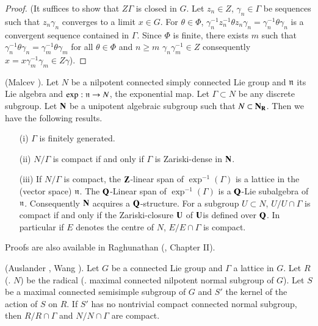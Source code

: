 \begin{proof}
(It suffices to show that $Z\Gamma$ is closed in $G$. Let $z_n \in Z$, $\gamma_n \in \Gamma$ be sequences such that $z_n \gamma_n$ converges to a limit $x \in G$. For $\theta \in \Phi$, $\gamma^{-1}_n z^{-1}_n \theta z_n \gamma_n = \gamma_n^{-1} \theta \gamma_n$ is a convergent sequence contained in $\Gamma$. Since $\Phi$ is finite, there exists $m$ such that $\gamma^{-1}_n \theta \gamma_n = \gamma^{-1}_m \theta \gamma_m$ for all $\theta \in \Phi$ and $n \geqslant m$ \ie $\gamma_n \gamma^{-1}_m \in Z$ consequently $x = x \gamma^{-1}_m \gamma_m \in Z \gamma$).
\end{proof}

\begin{romantheorem}{\rm (Malcev \cite{art9-key1}).}\label{art9-romanthm2}
Let $N$ be a nilpotent connected simply connected Lie group and $\mathfrak{n}$ its Lie algebra and $\exp: \mathfrak{n} \to N$, the exponential map. Let $\Gamma \subset N$ be any discrete subgroup. Let $\mathbf{N}$ be a unipotent algebraic subgroup such that $N \subset \mathbf{N}_{\mathbf{R}}$. Then we have the following results.
\begin{itemize}
\item[(i)] $\Gamma$ is finitely generated.

\item[(ii)] $N/\Gamma$ is compact if and only if $\Gamma$ is Zariski-dense in $\mathbf{N}$.

\item[(iii)] If $N/ \Gamma$ is compact, the $\mathbf{Z}$-linear span of $\exp^{-1} (\Gamma)$ is a lattice in the (vector space) $\mathfrak{n}$. The $\mathbf{Q}$-Linear span of $\exp^{-1} (\Gamma)$ is a $\mathbf{Q}$-Lie subalgebra of $\mathfrak{n}$. Consequently $\mathbf{N}$ acquires a $\mathbf{Q}$-structure. For a subgroup $U \subset N$, $U/U \cap \Gamma$ is compact if and only if the Zariski-closure $\mathbf{U}$ of $\mathbf{U}$\pageoriginale is defined over $\mathbf{Q}$. In particular if $E$ denotes the centre of $N$, $E/E \cap \Gamma$ is compact.
\end{itemize}
\end{romantheorem}

Proofs are also available in Raghunathan (\cite{art9-key1}, Chapter II).

\begin{romantheorem}{\rm (Auslander \cite{art9-key1}, Wang \cite{art9-key1}).}\label{art9-romanthm3}
Let $G$ be a connected Lie group and $\Gamma$ a lattice in $G$. Let $R$ (\resp. $N$) be the radical (\resp. maximal connected nilpotent normal subgroup of $G$). Let $S$ be a maximal connected semisimple subgroup of $G$ and $S'$ the kernel of the action of $S$ on $R$. If $S'$ has no nontrivial compact connected normal subgroup, then $R/R \cap \Gamma$ and $N/N \cap \Gamma$ are compact.
\end{romantheorem}

